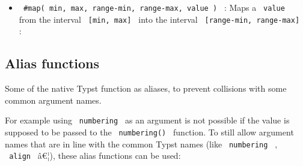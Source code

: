 \begin{itemize}
\begin{Shaded}
\begin{Highlighting}[]
\OperatorTok{=}\NormalTok{(}\OperatorTok{\%,} \OperatorTok{\%,}\NormalTok{(}\OperatorTok{,} \OperatorTok{,}
\end{Highlighting}
\end{Shaded}
\item
  \texttt{\ \#map(\ min,\ max,\ range-min,\ range-max,\ value\ )\ } :
  Maps a \texttt{\ value\ } from the interval
  \texttt{\ {[}min,\ max{]}\ } into the interval
  \texttt{\ {[}range-min,\ range-max{]}\ } :

\begin{Shaded}
\begin{Highlighting}[]
\OperatorTok{{-}}\OperatorTok{=} \NormalTok{(}\OperatorTok{,} \OperatorTok{,} \OperatorTok{,} \OperatorTok{,}\OperatorTok{{-}}
\end{Highlighting}
\end{Shaded}
\end{itemize}

\subsection{Alias functions}\label{alias-functions}

\begin{Shaded}
\begin{Highlighting}[]
\OperatorTok{:}
\end{Highlighting}
\end{Shaded}

Some of the native Typst function as aliases, to prevent collisions with
some common argument names.

For example using \texttt{\ numbering\ } as an argument is not possible
if the value is supposed to be passed to the \texttt{\ numbering()\ }
function. To still allow argument names that are in line with the common
Typst names (like \texttt{\ numbering\ } , \texttt{\ align\ } â€¦),
these alias functions can be used:

